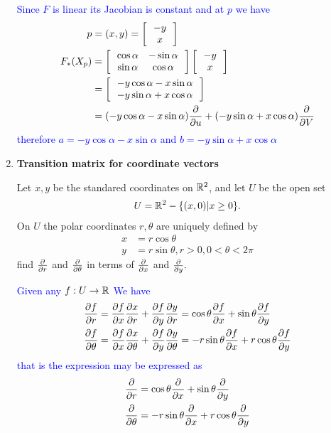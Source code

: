 \documentclass[10pt,a4paper]{report}
\newcommand{\BLUE}[1]{\textcolor{blue}{#1}}
\begin{document}
\begin{enumerate}[label=8.\arabic*.]
	\BLUE{Since $F$ is linear its Jacobian is constant and at $p$ we have 
	\begin{align*}
		p &= (x,y) = \left [\, \begin{array}{c}
			-y\\x
		\end{array}  \,\right ]\\
		F_*(X_p) &= \left [\, \begin{array}{cc}
		\cos \alpha & -\sin \alpha \\
		\sin \alpha & \cos \alpha		
		\end{array}
		 \,\right ]\left [\, \begin{array}{c}
		-y \\x		
		\end{array}
		 \,\right ] \\
		&= \left [\, \begin{array}{c}
		 -y\cos \alpha -x\sin\alpha \\
		 -y\sin \alpha + x\cos \alpha
		\end{array}
		 \,\right ] \\
		&= (-y\cos \alpha -x\sin\alpha)\frac{\partial }{\partial u} + (-y\sin \alpha + x\cos \alpha)\frac{\partial }{\partial V}
\end{align*}	therefore $a = -y\cos \alpha -x\sin\alpha$ and $b=-y\sin \alpha + x\cos \alpha$
	}
	
	\item \textbf{Transition matrix for coordinate vectors}
	
	Let $x,y$ be the standared coordinates on $\mathbb{R}^2$, and let $U$ be the open set
	\begin{align*}
		U = \mathbb{R}^2-\{(x,0)|x \ge 0\}.
	\end{align*}On $U$ the polar coordinates $r,\theta$ are uniquely defined by
	\begin{align*}
		x &= r\cos \theta \\
		y &= r\sin \theta, r >0, 0<\theta< 2\pi
	\end{align*}find $\frac{\partial }{\partial r}$ and $\frac{\partial }{\partial \theta}$ in terms of $\frac{\partial }{\partial x}$ and $\frac{\partial }{\partial y}.$
	
	\BLUE{Given any $f: U \to \mathbb{R}$  We have 
	\begin{align*}
		\frac{\partial f}{\partial r} &= \frac{\partial f}{\partial x}\frac{\partial x}{\partial r} + \frac{\partial f}{\partial y}\frac{\partial y}{\partial r} = \cos \theta \frac{\partial f}{\partial x} + \sin \theta \frac{\partial f}{\partial y} \\
		\frac{\partial f}{\partial \theta} &= \frac{\partial f}{\partial x}\frac{\partial x}{\partial \theta} + \frac{\partial f}{\partial y}\frac{\partial y}{\partial \theta} = -r\sin \theta \frac{\partial f}{\partial x} + r\cos \theta \frac{\partial f}{\partial y} 
\end{align*}	that is the expression may be expressed as 
\begin{align*}
		\frac{\partial }{\partial r} &= \cos \theta \frac{\partial }{\partial x} + \sin \theta \frac{\partial }{\partial y} \\
		\frac{\partial }{\partial \theta} &= -r\sin \theta \frac{\partial }{\partial x} + r\cos \theta \frac{\partial }{\partial y} 
\end{align*}
	}
\end{enumerate}
\end{document}
